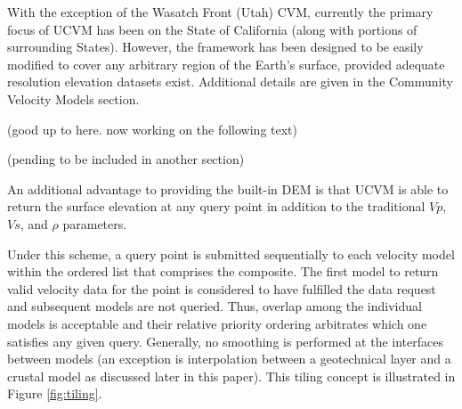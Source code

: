 With the exception of the Wasatch Front (Utah) CVM, currently the primary focus of UCVM has been on the State of California (along with portions of surrounding States). However, the framework has been designed to be easily modified to cover any arbitrary region of the Earth's surface, provided adequate resolution elevation datasets exist. Additional details are given in the Community Velocity Models section. 



(good up to here. now working on the following text)

(pending to be included in another section)

An additional advantage to providing the built-in DEM is that UCVM is able to return the surface elevation at any query point in addition to the traditional $Vp$, $Vs$, and $\rho$ parameters.



Under this scheme, a query point is submitted sequentially to each velocity model within the ordered list that comprises the composite. The first model to return valid velocity data for the point is considered to have fulfilled the data request and subsequent models are not queried. Thus, overlap among the individual models is acceptable and their relative priority ordering arbitrates which one satisfies any given query. Generally, no smoothing is performed at the interfaces between models (an exception is interpolation between a geotechnical layer and a crustal model as discussed later in this paper). This tiling concept is illustrated in Figure \ref{fig:tiling}.

